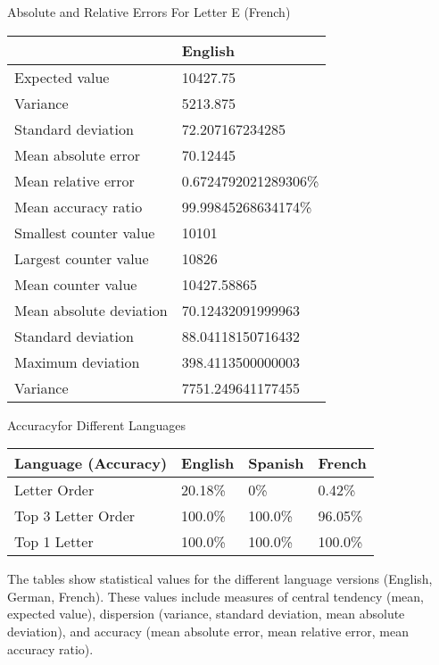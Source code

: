 \documentclass[]{revdetua}
\begin{document}
\begin{table}[!ht]
    \centering
    Absolute and Relative Errors For Letter E (French)\linebreak\linebreak
    \begin{tabular}{|l|l|}
    \hline
        ~ & English \\ \hline
        Expected value & 10427.75 \\ \hline
        Variance & 5213.875 \\ \hline
        Standard deviation & 72.207167234285 \\ \hline
        Mean absolute error & 70.12445 \\ \hline
        Mean relative error & 0.6724792021289306\% \\ \hline
        Mean accuracy ratio & 99.99845268634174\% \\ \hline
        Smallest counter value & 10101 \\ \hline
        Largest counter value & 10826 \\ \hline
        Mean counter value & 10427.58865 \\ \hline
        Mean absolute deviation & 70.12432091999963 \\ \hline
        Standard deviation & 88.04118150716432 \\ \hline
        Maximum deviation & 398.4113500000003 \\ \hline
        Variance & 7751.249641177455 \\ \hline
    \end{tabular}
\end{table}

\begin{table}[!ht]
    \centering
    Accuracyfor Different Languages
    \begin{tabular}{|l|l|l|l|}
    \hline
        Language (Accuracy) & English & Spanish & French \\ \hline
        Letter Order & 20.18\% & 0\% & 0.42\% \\ \hline
        Top 3 Letter Order & 100.0\% & 100.0\% & 96.05\% \\ \hline
        Top 1 Letter & 100.0\% & 100.0\% & 100.0\% \\ \hline
    \end{tabular}
\end{table}

The tables show statistical values for the different language versions (English, German, French). These values include measures of central tendency (mean, expected value), dispersion (variance, standard deviation, mean absolute deviation), and accuracy (mean absolute error, mean relative error, mean accuracy ratio).
\end{document}
